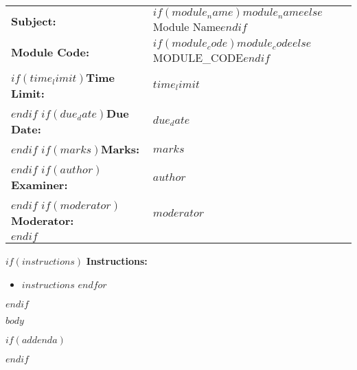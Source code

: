 \documentclass[addpoints$if(solutions)$,answers$endif$]{exam}
\newcommand{\tightlist}{%
  \setlength{\itemsep}{0pt}\setlength{\parskip}{0pt}}
\begin{document}
\noindent
\begin{tabular}{@{}ll@{}}
\textbf{Subject:} & $if(module_name)$$module_name$$else$Module Name$endif$ \\
\textbf{Module Code:} & $if(module_code)$$module_code$$else$MODULE_CODE$endif$ \\
$if(time_limit)$\textbf{Time Limit:} & $time_limit$ \\$endif$
$if(due_date)$\textbf{Due Date:} & $due_date$ \\$endif$
$if(marks)$\textbf{Marks:} & $marks$ \\$endif$
$if(author)$\textbf{Examiner:} & $author$ \\$endif$
$if(moderator)$\textbf{Moderator:} & $moderator$ \\$endif$
\end{tabular}

\vspace{2em}

$if(instructions)$
\noindent\textbf{Instructions:}
\begin{itemize}
\tightlist
$for(instructions)$
\item $instructions$
$endfor$
\end{itemize}
\vspace{1em}
$endif$

\begin{questions}
$body$
\end{questions}

$if(addenda)$

$endif$
\end{document}

